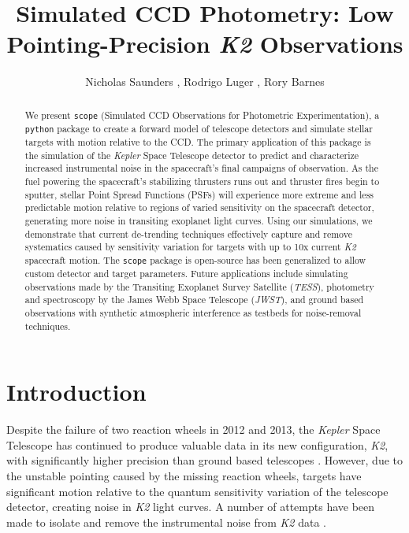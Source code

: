 \documentclass[12pt,preprint]{aastex}
\begin{document}
\title{Simulated CCD Photometry: Low Pointing-Precision \textit{K2} Observations}

\author{Nicholas Saunders , Rodrigo Luger , Rory Barnes }


\begin{abstract}

	We present \texttt{scope} (Simulated CCD Observations for Photometric Experimentation), a \texttt{python} package to create a forward model of telescope detectors and simulate stellar targets with motion relative to the CCD. The primary application of this package is the simulation of the \textit{Kepler} Space Telescope detector to predict and characterize increased instrumental noise in the spacecraft's final campaigns of observation. As the fuel powering the spacecraft's stabilizing thrusters runs out and thruster fires begin to sputter, stellar Point Spread Functions (PSFs) will experience more extreme and less predictable motion relative to regions of varied sensitivity on the spacecraft detector, generating more noise in transiting exoplanet light curves. Using our simulations, we demonstrate that current de-trending techniques  effectively capture and remove systematics caused by sensitivity variation for targets with up to 10x current \textit{K2} spacecraft motion. The \texttt{scope} package is open-source has been generalized to allow custom detector and target parameters. Future applications include simulating observations made by the Transiting Exoplanet Survey Satellite (\textit{TESS}), photometry and spectroscopy by the James Webb Space Telescope (\textit{JWST}), and ground based observations with synthetic atmospheric interference as testbeds for noise-removal techniques.

\end{abstract}

\section{Introduction}
\label{sec:intro}

Despite the failure of two reaction wheels in 2012 and 2013, the \textit{Kepler} Space Telescope has continued to produce valuable data in its new configuration, \textit{K2}, with significantly higher precision than ground based telescopes \citep{2014PASP..126..398H}. However, due to the unstable pointing caused by the missing reaction wheels, targets have significant motion relative to the quantum sensitivity variation of the telescope detector, creating noise in \textit{K2} light curves. A number of attempts have been made to isolate and remove the instrumental noise from \textit{K2} data \citep{2015A&A...579A..19A, 0004-637X-806-1-30, 2015MNRAS.454.4159H, 2015MNRAS.447.2880A, 2016MNRAS.459.2408A}.
\end{document}
